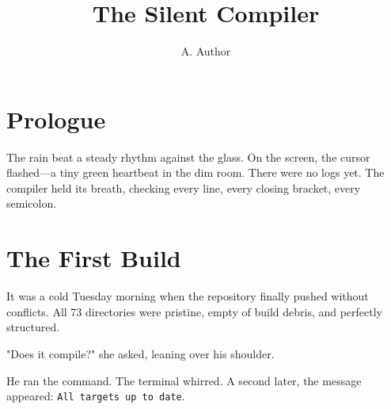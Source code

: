 \documentclass[12pt,b5paper,twoside,openright]{book}
\title{\bfseries The Silent Compiler}
\author{A. Author}
\date{}
\begin{document}
\maketitle

\chapter*{Prologue}
The rain beat a steady rhythm against the glass. On the screen, the cursor flashed—a tiny green heartbeat in the dim room. There were no logs yet. The compiler held its breath, checking every line, every closing bracket, every semicolon.

\chapter{The First Build}
It was a cold Tuesday morning when the repository finally pushed without conflicts. All 73 directories were pristine, empty of build debris, and perfectly structured.

"Does it compile?" she asked, leaning over his shoulder.

He ran the command. The terminal whirred. A second later, the message appeared: \texttt{All targets up to date}.
\end{document}
